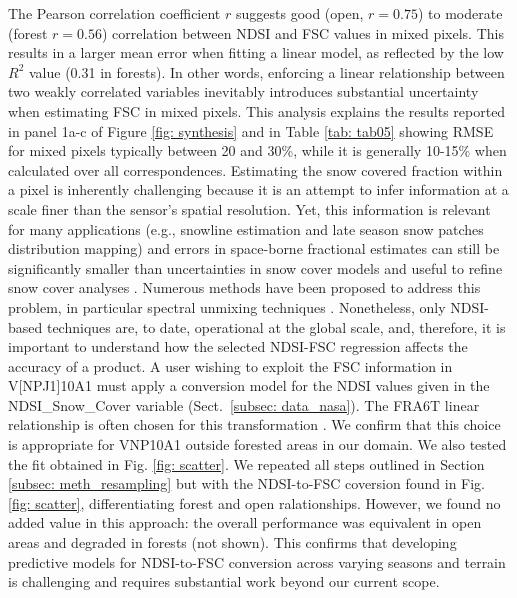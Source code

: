 \documentclass[tc, manuscript]{copernicus}
\begin{document}
The Pearson correlation coefficient $r$ suggests good (open, $r=0.75$) to moderate (forest $r=0.56$) correlation between NDSI and FSC values in mixed pixels. This results in a larger mean error when fitting a linear model, as reflected by the low $R^2$ value (0.31 in forests). In other words, enforcing a linear relationship between two weakly correlated variables inevitably introduces substantial uncertainty when estimating FSC in mixed pixels. This analysis explains the results reported in panel 1a-c of Figure \ref{fig: synthesis} and in Table \ref{tab: tab05} showing RMSE for mixed pixels typically between 20 and 30\%, while it is generally 10-15\% when calculated over all correspondences. Estimating the snow covered fraction within a pixel is inherently challenging because it is an attempt to infer information at a scale finer than the sensor’s spatial resolution. Yet, this information is relevant for many applications (e.g., snowline estimation and late season snow patches distribution mapping) and errors in space-borne fractional estimates can still be significantly smaller than uncertainties in snow cover models \citep{girotto_data_2020} and useful to refine snow cover analyses  \citep{aalstad_evaluating_2020}. Numerous methods have been proposed to address this problem, in particular spectral unmixing techniques \citep{painter_retrieval_2009}. Nonetheless, only NDSI-based techniques are, to date, operational at the global scale, and, therefore, it is important to understand how the selected NDSI-FSC regression affects the accuracy of a product. A user wishing to exploit the FSC information in V[NP\textbar J1]10A1 must apply a conversion model for the NDSI values given in the NDSI\_Snow\_Cover variable (Sect.~\ref{subsec: data_nasa}). The FRA6T linear relationship \citep{salomonson_development_2006} is often chosen for this transformation \citep{stillinger_landsat_2023,masson_assessment_2018}. We confirm that this choice is appropriate for VNP10A1 outside forested areas in our domain. We also tested the fit obtained in Fig. \ref{fig: scatter}. We repeated all steps outlined in Section \ref{subsec: meth_resampling} but with the NDSI-to-FSC coversion found in Fig. \ref{fig: scatter}, differentiating forest and open ralationships. However, we found no added value in this approach: the overall performance was equivalent in open areas and degraded in forests (not shown). This confirms that developing predictive models for NDSI-to-FSC conversion across varying seasons and terrain is challenging and requires substantial work beyond our current scope.
\end{document}
